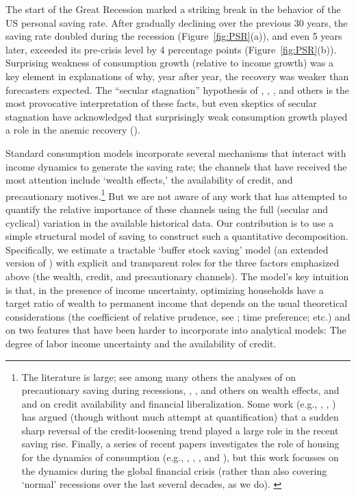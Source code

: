 \documentclass[titlepage]{\econtex}
\begin{document}
The start of the Great Recession marked a striking break in the behavior of the US personal saving rate. After gradually declining over the previous 30 years, the saving rate doubled during the recession  (Figure~\ref{fig:PSR}(a)), and even 5 years later, exceeded its pre-crisis level by 4 percentage points (Figure~\ref{fig:PSR}(b)).  Surprising weakness of consumption growth (relative to income growth) was  a key element in explanations of why, year after year, the recovery was weaker than forecasters expected.  The ``secular stagnation'' hypothesis of \cite{summersSecStagReuters,summersSecStagAER}, \cite{krugmanSecStagNYT,krugmanSecStagCEPR}, \cite{gordonSecStag}, and others is the most provocative interpretation of these facts, but even skeptics of secular stagnation have acknowledged that surprisingly weak consumption growth played a role in the anemic recovery (\cite{hhhwSecStagNo}).

Standard consumption models incorporate several mechanisms that interact with income dynamics to generate the saving rate; the channels that have received the most attention include `wealth effects,' the availability of credit, and precautionary motives.\footnote{The literature is large; see among many others the analyses of \cite{carroll:brookings} on precautionary saving during recessions, \cite{cos11}, \cite{mrsBalance}, \cite{BergerEtAl:HPandC} and others on wealth effects, and \cite{mue07} and \cite{parker_nberma_spendthrift} on credit availability and financial liberalization. Some work (e.g., \cite{hall:slump}, \cite{gkLiq}, \cite{glLiq}) has argued (though without much attempt at quantification) that a
sudden sharp reversal of the credit-loosening trend played a large role in the recent saving rise.
Finally, a series of recent papers investigates the role of housing for the dynamics of consumption  (e.g., \cite{justPrimTamb:CredSupplyAndHouseBoom}, \cite{huoRRfinFrictionsGR}, \cite{garrigaHedlund}, \cite{kmv:houseBoomBust} and \cite{goreaMidriganLiqConstraints}), but this work focusses on the dynamics during the global financial crisis (rather than also covering `normal' recessions over the last several decades, as we do). \label{foot:PSRlit}}  But we are not aware of any work that has attempted to quantify the relative importance of these channels using the full (secular and cyclical) variation in the available historical data.  Our contribution is to use a simple structural model of saving to construct such a quantitative decomposition.  Specifically, we estimate a tractable `buffer stock saving' model (an extended version of \cite{ctDiscrete}) with explicit and transparent roles for the three factors emphasized above (the wealth, credit, and precautionary channels). The model's key intuition is that, in the presence of income uncertainty, optimizing households have a target ratio of wealth to permanent income that depends on the usual theoretical considerations (the coefficient of relative prudence, see \cite{kimball:standardra}; time preference; etc.) and on two features that have been harder to incorporate into analytical models: The degree of labor income uncertainty and the availability of credit.
\end{document}
